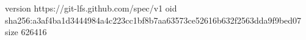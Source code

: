 version https://git-lfs.github.com/spec/v1
oid sha256:a3af4ba1d3444984a4c223cc1bf8b7aa63573ce52616b632f2563dda9f9bed07
size 626416
